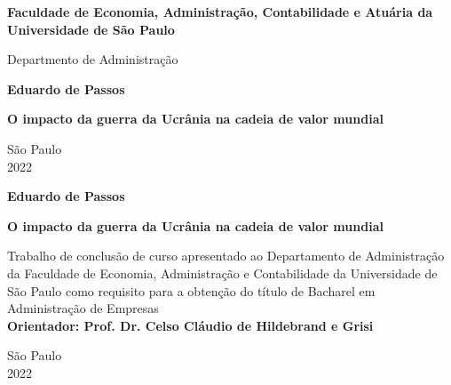 \documentclass[12pt]{article}
\begin{document}
\begin{titlepage}
    \begin{center}
        \Large
        \textbf{Faculdade de Economia, Administração, Contabilidade e Atuária da Universidade de São Paulo}
        
        \large
        \vspace{0.4cm}
        Departmento de Administração
             
        \vspace{4cm}
        \textbf{Eduardo de Passos}

        \vspace{4cm}
        \textbf{O impacto da guerra da Ucrânia na cadeia de valor mundial}

        \vspace{8cm}
        São Paulo\\
        2022\\
             
    \end{center}
\end{titlepage}
\begin{titlepage}
    \begin{center}
        \vspace{4cm}
        \large\textbf{Eduardo de Passos}
             
        
        \vspace{4cm}
        \large\textbf{O impacto da guerra da Ucrânia na cadeia de valor mundial}
    \end{center}

        \vspace{4cm}
        \hspace{7cm}
        \begin{minipage}{22em}
            Trabalho de conclusão de curso
            apresentado ao Departamento de
            Administração da Faculdade de Economia,
            Administração e Contabilidade da
            Universidade de São Paulo como requisito  para a
            obtenção do título de Bacharel 
            em Administração de Empresas\\
            \textbf{Orientador: Prof. Dr. Celso Cláudio de Hildebrand e Grisi}
        \end{minipage}
              
        \hspace{7cm}
    
    \vspace{8cm}
    \begin{center}
        São Paulo\\
        2022\\
    \end{center}
\end{titlepage}

\cite{rootsWarNYT22}


\end{document}

